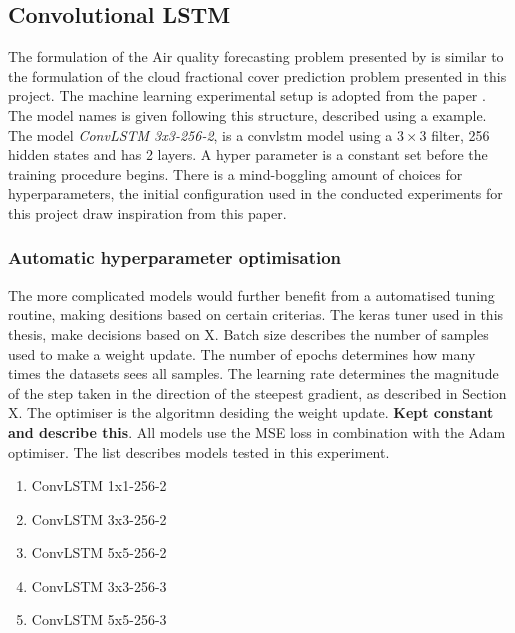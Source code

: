 \subsection{Convolutional LSTM}
The formulation of the Air quality forecasting problem presented by  \citeauthor{SunAirLSTM} is similar to the formulation of the cloud fractional cover prediction problem presented in this project. The machine learning experimental setup is adopted from the paper . The model names is given following this structure, described using a example. The model \textit{ConvLSTM 3x3-256-2}, is a \acrshort{convlstm} model using a $3\times 3$ filter, 256 hidden states and has 2 layers. A hyper parameter is a constant set before the training procedure begins. There is a mind-boggling amount of choices for hyperparameters, the initial configuration used in the conducted experiments for this project draw inspiration from this paper. 

\subsubsection{Automatic hyperparameter optimisation}  \label{sec:hyperparam_tuning}
The more complicated models would further benefit from a automatised tuning routine, making desitions based on certain criterias.
The keras tuner used in this thesis, make decisions based on X. Batch size describes the number of samples used to make a weight update. The number of epochs determines how many times the datasets sees all samples. The learning rate determines the magnitude of the step taken in the direction of the steepest gradient, as described in Section X. The optimiser is the algoritmn desiding the weight update. \textbf{Kept constant and describe this}. All models use the MSE loss in combination with the Adam optimiser. The list describes models tested in this experiment. 

\begin{enumerate}[noitemsep, topsep=0pt]
    \item ConvLSTM 1x1-256-2
    \item ConvLSTM 3x3-256-2
    \item ConvLSTM 5x5-256-2
    \item ConvLSTM 3x3-256-3
    \item ConvLSTM 5x5-256-3
\end{enumerate}

